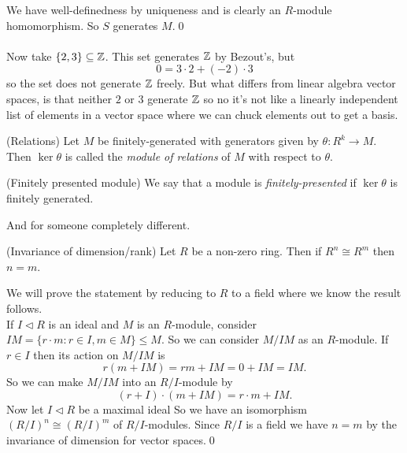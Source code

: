 \documentclass{article}
\newcommand{\nrm}{\triangleleft}
\begin{document}
\begin{itemize}
\[\]
We have well-definedness by uniqueness and is clearly an $ R $-module homomorphism. So $ S $ generates $ M $.\qed
\\\\
Now take $ \{2,3\}\subseteq \mathbb{Z} $. This set generates $ \mathbb{Z} $ by Bezout's, but
\[
  0=3\cdot 2 + (-2)\cdot 3
\]
so the set does not generate $ \mathbb{Z} $ freely. But what differs from linear algebra vector spaces, is that neither $ 2 $ or $ 3 $ generate $ \mathbb{Z} $ so no it's not like a linearly independent list of elements in a vector space where we can chuck elements out to get a basis.
\begin{definition}
	(Relations) Let $ M $ be finitely-generated with generators given by $\theta: R^k\to M $. Then $ \ker \theta $ is called the \textit{module of relations} of $ M $ with respect to $ \theta $.
\end{definition}
\begin{definition}
	(Finitely presented module) We say that a module is \textit{finitely-presented} if $ \ker\theta $ is finitely generated.
\end{definition}
And for someone completely different.
\begin{proposition}
	(Invariance of dimension/rank) Let $ R $ be a non-zero ring. Then if $ R^n\cong R^m $ then $ n=m $.
\end{proposition}
\pf We will prove the statement by reducing to $ R $ to a field where we know the result follows.\\
If $ I\nrm R $ is an ideal and $ M $ is an $ R $-module, consider $ IM = \{ r\cdot m:r\in I, m\in M\}\le M $. So we can consider $ M/IM $ as an $ R $-module. If $ r\in I $ then its action on $ M/IM $ is
\[
  r(m+IM)=rm+IM=0+IM=IM.
\]
So we can make $ M/IM $ into an $R/I$-module by
\[
	(r+I)\cdot (m+IM)=r\cdot m+IM.
\]
Now let $ I\nrm R $ be a maximal ideal So we have an isomorphism $ (R/I)^n\cong (R/I)^m $ of $ R/I $-modules. Since $ R/I $ is a field we have $ n=m $ by the invariance of dimension for vector spaces.\qed

\end{itemize}
\end{document}
